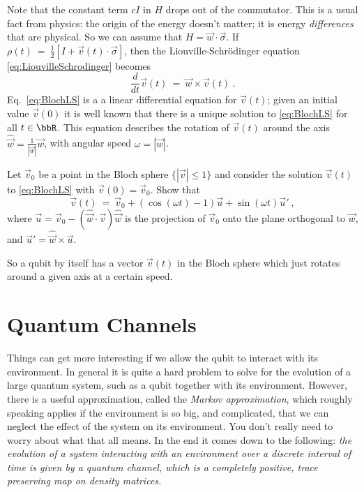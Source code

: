\documentclass[12pt]{amsart}
\numberwithin{equation}{section}
\numberwithin{figure}{section}
\theoremstyle{theorem}
\begin{document}
Note that the constant term $cI$ in $H$ drops out of the commutator.  This is a 
usual fact from physics: the origin of the energy doesn't matter; it is energy 
\emph{differences} that are physical.  So we can assume that $H=\vec{w}\cdot
\vec{\sigma}$.  If $\rho(t) \ = \ \frac{1}{2}[I + \vec{v}(t)\cdot 
\vec{\sigma}]$, then  the Liouville-Schr\"odinger equation 
\eqref{eq:LiouvilleSchrodinger} becomes
\begin{equation}\label{eq:BlochLS}
	\frac{d}{dt} \vec{v}(t) \ = \ \vec{w} \times \vec{v}(t) \ . 
\end{equation}
Eq.\ \eqref{eq:BlochLS} is a a linear differential equation for 
$\vec{v}(t)$; given an initial value $\vec{v}(0)$ it is well known that there 
is a unique solution to \eqref{eq:BlochLS} for all $t\in \bbR$.  This equation  
describes the rotation of 
$\vec{v}(t)$ around the axis $\hat{\vec{w}} = \frac{1}{|\vec{w}|}\vec{w}$, 
with angular speed $\omega=|\vec{w}|$. 
\begin{exer} Let $\vec{v}_0$ be a point in the Bloch sphere 
$\{|\vec{v}|\le 1\}$ and consider the solution $\vec{v}(t)$ to 
\eqref{eq:BlochLS} with $\vec{v}(0) = \vec{v}_0$. 
 Show that 
$$\vec{v}(t) \ = \ \vec{v}_0 + ( \cos(\omega t) -1)\vec{u} + \sin(\omega t) 
\vec{u}' \ , $$
where 
$ \vec{u} =  \vec{v}_0 - ( \hat{\vec{w}}\cdot \vec{v}) 
\hat{\vec{w}}$
is the projection of $\vec{v}_0$ onto the plane orthogonal to $\vec{w}$,  and 
$\vec{u}' = \hat{\vec{w}}\times \vec{u}$.
\end{exer}
So a qubit by itself has a vector $\vec{v}(t)$ in the Bloch sphere which just 
rotates around a given axis at a certain speed.  

\section{Quantum Channels} Things can get more 
interesting if we allow the qubit to interact with its environment.  In general 
it is quite a hard problem to solve for the evolution of a large quantum 
system, such as a qubit together with its environment.  However, there is a 
useful approximation, called the \emph{Markov approximation}, 
  which roughly speaking applies if the environment is so big, and complicated, 
  that we can neglect the effect of the system on its environment.  You 
  don't really need to worry about what that all means.  In the end it comes 
  down to the following: \emph{the evolution of a system interacting with an 
  environment over a discrete interval of time is given by a \emph{quantum 
  channel}, which is a \emph{completely positive, trace preserving} map on 
  density matrices.} 
\end{document}
